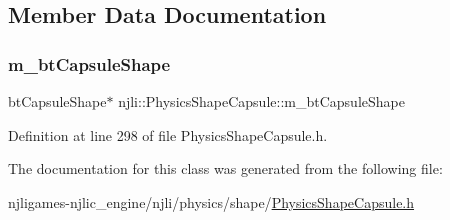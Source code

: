 \subsection{Member Data Documentation}
\mbox{\label{classnjli_1_1_physics_shape_capsule_a5f0db680ed20e467ade57cb3c40b96a8}} 
\subsubsection{\texorpdfstring{m\+\_\+bt\+Capsule\+Shape}{m\_btCapsuleShape}}
{\footnotesize\ttfamily bt\+Capsule\+Shape$\ast$ njli\+::\+Physics\+Shape\+Capsule\+::m\+\_\+bt\+Capsule\+Shape\hspace{0.3cm}{\ttfamily [private]}}



Definition at line 298 of file Physics\+Shape\+Capsule.\+h.



The documentation for this class was generated from the following file\+:\begin{DoxyCompactItemize}
\item 
njligames-\/njlic\+\_\+engine/njli/physics/shape/\mbox{\hyperlink{_physics_shape_capsule_8h}{Physics\+Shape\+Capsule.\+h}}\end{DoxyCompactItemize}
